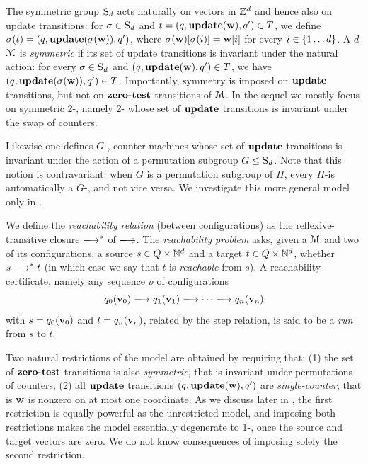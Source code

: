 The symmetric group $\textsc{S}_{d}$ acts naturally on vectors in $\mathbb{Z}^d$
and hence also on update transitions:
for $\sigma\in \textsc{S}_{d}$ and $t=(q,\textbf{update}(\mathbf{w}),q')\in T$, we define
$\sigma(t)=(q,\textbf{update}(\sigma(\mathbf{w})),q')$, where $\sigma(\mathbf{w})[\sigma(i)]=\mathbf{w}[i]$
for every $i\in\{1\ldots d\}$.
A $d$-\cm $\mathcal{M}$ is \emph{symmetric} if its set of update transitions
is invariant under the natural action: for every $\sigma\in \textsc{S}_{d}$ 
and $(q,\textbf{update}(\mathbf{w}),q')\in T$, we have $(q,\textbf{update}(\sigma (\mathbf{w})),q')\in T$.
Importantly, 
symmetry is imposed on $\textbf{update}$ transitions, but not on 
$\textbf{zero-test}$ transitions of $\mathcal{M}$.
% 
In the sequel
we mostly focus on symmetric 2-,
namely 2- whose set of $\textbf{update}$ transitions is invariant under the
swap of counters.

\begin{remark}
    Likewise one defines $G$-, counter machines whose 
    set of $\textbf{update}$ 
    transitions is invariant under the action of a permutation subgroup
    $G\leq\textsc{S}_{d}$.
    Note that this notion is contravariant: when $G$ is a permutation subgroup of $H$, every
    $H$-\cm is automatically a $G$-\cm, and not vice versa.
    We investigate this more general model only in 
    . 
\end{remark}
We define the \emph{reachability relation} (between configurations)
as the reflexive-transitive closure $\step^*$ of $\step$.
The \emph{reachability problem} asks, given a \cm $\mathcal{M}$ and two
of its configurations, a source $s\in Q\times\mathbb{N}^d$ and a target $t\in Q\times\mathbb{N}^d$, 
whether 
$s \step^* t$
(in which case we say that $t$ is \emph{reachable} from $s$).
A reachability certificate, namely any sequence $\rho$ of configurations
\[
q_0(\vr v_0) \step q_1(\vr v_1) \step \cdots \step q_n(\vr v_n)
\]
with $s = q_0(\mathbf{v}_0)$ and $t = q_n(\mathbf{v}_n)$,
related by the step relation,
is said to be a \emph{run} from $s$ to $t$.

Two natural restrictions of the model are obtained by requiring that:
(1) the set of $\textbf{zero-test}$ transitions is also \emph{symmetric}, 
that is invariant under permutations of counters; 
(2) all $\textbf{update}$ transitions $(q,\textbf{update}(\mathbf{w}),q')$ are 
\emph{single-counter}, that is $\mathbf{w}$ is nonzero on at most one coordinate.
% 
As we discuss later in , the first 
restriction is equally powerful as the unrestricted model,
and imposing both restrictions makes the model essentially degenerate 
to 1-\vass, once the source and target vectors are zero.
We do not know consequences of 
imposing solely the second restriction.






